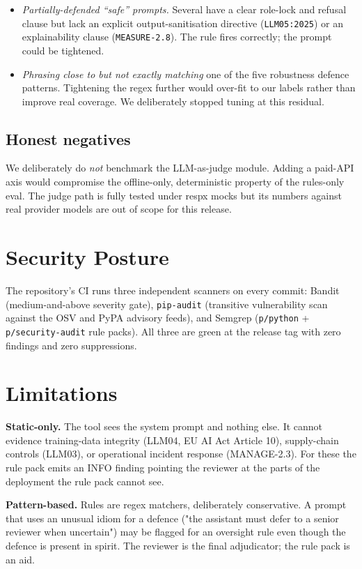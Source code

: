 \documentclass[conference]{IEEEtran}
\begin{document}
\begin{itemize}
  \item \emph{Partially-defended ``safe'' prompts.} Several have a
        clear role-lock and refusal clause but lack an explicit
        output-sanitisation directive (\texttt{LLM05:2025}) or an
        explainability clause (\texttt{MEASURE-2.8}). The rule fires
        correctly; the prompt could be tightened.
  \item \emph{Phrasing close to but not exactly matching} one of
        the five robustness defence patterns. Tightening the regex
        further would over-fit to our labels rather than improve
        real coverage. We deliberately stopped tuning at this
        residual.
\end{itemize}

\subsection{Honest negatives}
We deliberately do \emph{not} benchmark the LLM-as-judge module.
Adding a paid-API axis would compromise the offline-only,
deterministic property of the rules-only eval. The judge path is
fully tested under respx mocks but its numbers against real
provider models are out of scope for this release.

\section{Security Posture}
The repository's CI runs three independent scanners on every commit:
Bandit (medium-and-above severity gate), \texttt{pip-audit}
(transitive vulnerability scan against the OSV and PyPA advisory
feeds), and Semgrep (\texttt{p/python} +
\texttt{p/security-audit} rule packs). All three are green at the
release tag with zero findings and zero suppressions.

\section{Limitations}
\textbf{Static-only.} The tool sees the system prompt and nothing
else. It cannot evidence training-data integrity (LLM04, EU AI
Act Article 10), supply-chain controls (LLM03), or operational
incident response (MANAGE-2.3). For these the rule pack emits an
INFO finding pointing the reviewer at the parts of the deployment
the rule pack cannot see.

\textbf{Pattern-based.} Rules are regex matchers, deliberately
conservative. A prompt that uses an unusual idiom for a defence
("the assistant must defer to a senior reviewer when uncertain")
may be flagged for an oversight rule even though the defence is
present in spirit. The reviewer is the final adjudicator; the rule
pack is an aid.
\end{document}
